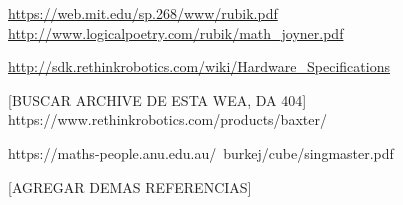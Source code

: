 \begin{thebibliography}{99}

	 \url{https://web.mit.edu/sp.268/www/rubik.pdf}
	 \url{http://www.logicalpoetry.com/rubik/math_joyner.pdf}

	 \url{http://sdk.rethinkrobotics.com/wiki/Hardware_Specifications}

	 [BUSCAR ARCHIVE DE ESTA WEA, DA 404] {https://www.rethinkrobotics.com/products/baxter/}

	 https://maths-people.anu.edu.au/~burkej/cube/singmaster.pdf

	[AGREGAR DEMAS REFERENCIAS]

\end{thebibliography}
